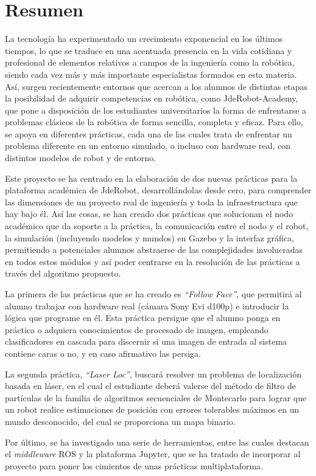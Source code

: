 \chapter*{Resumen}
\setlength{\parskip}{1ex}

La tecnología ha experimentado un crecimiento exponencial en los últimos tiempos, lo que se traduce en una acentuada presencia en la vida cotidiana y profesional de elementos relativos a campos de la ingeniería como la robótica, siendo cada vez más y más importante especialistas formados en esta materia. Así, surgen recientemente entornos que acercan a los alumnos de distintas etapas la posibilidad de adquirir competencias en robótica, como JdeRobot-Academy, que pone a disposición de los estudiantes universitarios la forma de enfrentarse a problemas clásicos de la robótica de forma sencilla, completa y eficaz. Para ello, se apoya en diferentes prácticas, cada una de las cuales trata de enfrentar un problema diferente en un entorno simulado, o incluso con hardware real, con distintos modelos de robot y de entorno.

Este proyecto se ha centrado en la elaboración de dos nuevas prácticas para la plataforma académica de JdeRobot, desarrollándolas desde cero, para comprender las dimensiones de un proyecto real de ingeniería y toda la infraestructura que hay bajo él. Así las cosas, se han creado dos prácticas que solucionan el nodo académico que da soporte a la práctica, la comunicación entre el nodo y el robot, la simulación (incluyendo modelos y mundos) en Gazebo y la interfaz gráfica, permitiendo a potenciales alumnos abstraerse de las complejidades involucradas en todos estos módulos y así poder centrarse en la resolución de las prácticas a través del algoritmo propuesto. 

La primera de las prácticas que se ha creado es \textit{``Follow Face''}, que permitirá al alumno trabajar con hardware real (cámara Sony Evi d100p) e introducir la lógica que programe en él. Esta práctica persigue que el alumno ponga en práctica o adquiera conocimientos de procesado de imagen, empleando clasificadores en cascada para discernir si una imagen de entrada al sistema contiene caras o no, y en caso afirmativo las persiga.

La segunda práctica, \textit{``Laser Loc''}, buscará resolver un problema de localización basada en láser, en el cual el estudiante deberá valerse del método de filtro de partículas de la familia de algoritmos secuenciales de Montecarlo para lograr que un robot realice estimaciones de posición con errores tolerables máximos en un mundo desconocido, del cual se proporciona un mapa binario.

Por último, se ha investigado una serie de herramientas, entre las cuales destacan el \textit{middleware} ROS y la plataforma Jupyter, que se ha tratado de incorporar al proyecto para poner los cimientos de unas prácticas multiplataforma.
\restoregeometry